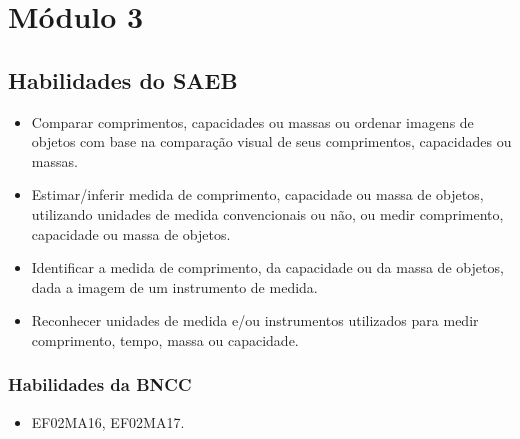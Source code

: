 \chapter{Módulo 3}


\vspace*{-1cm}

\section*{Habilidades do SAEB}

\begin{itemize}
\item Comparar comprimentos, capacidades ou massas ou ordenar imagens de
  objetos com base na comparação visual de seus comprimentos, capacidades ou massas.

\item Estimar/inferir medida de comprimento, capacidade ou massa de objetos,
  utilizando unidades de medida convencionais ou não, ou medir
  comprimento, capacidade ou massa de objetos.

\item Identificar a medida de comprimento, da capacidade ou da massa de
  objetos, dada a imagem de um instrumento de medida.

\item Reconhecer unidades de medida e/ou instrumentos utilizados para medir
  comprimento, tempo, massa ou capacidade.
\end{itemize}

\subsection{Habilidades da BNCC}

\begin{itemize}
\item EF02MA16, EF02MA17.
\end{itemize}

